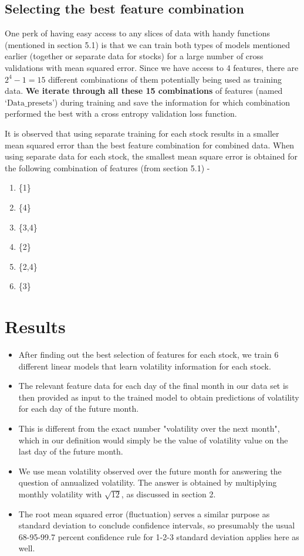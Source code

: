 \documentclass{article}
\begin{document}
\subsection{Selecting the best feature combination}
One perk of having easy access to any slices of data with handy functions (mentioned in section 5.1) is that we can train both types of models mentioned earlier (together or separate data for stocks) for a large number of cross validations with mean squared error. Since we have access to 4 features, there are $2^4-1 = 15$ different combinations of them potentially being used as training data. \textbf{We iterate through all these 15 combinations} of features (named $\text{`Data\_presets'}$) during training and save the information for which combination performed the best with a cross entropy validation loss function. 

It is observed that using separate training for each stock results in a smaller mean squared error than the best feature combination for combined data. When using separate data for each stock, the smallest mean square error is obtained for the following combination of features (from section 5.1) -
\begin{multicols}{6}
	\begin{enumerate}[a :]
		\item \{1\}		
		\item \{4\}
		\item \{3,4\}
		\item \{2\}
		\item \{2,4\}
		\item \{3\}
	\end{enumerate}
\end{multicols}

\section{Results}
\begin{itemize}
	\item After finding out the best selection of features for each stock, we train $6$ different linear models that learn volatility information for each stock. 
	\item The relevant feature data for each day of the final month in our data set is then provided as input to the trained model to obtain predictions of volatility for each day of the future month. 
	\item This is different from the exact number "volatility over the next month", which in our definition would simply be the value of volatility value on the last day of the future month. 
	\item We use mean volatility observed over the future month for answering the question of annualized volatility. The answer is obtained by multiplying monthly volatility with $\sqrt{12}$, as discussed in section 2.
	\item The root mean squared error (fluctuation) serves a similar purpose as standard deviation to conclude confidence intervals, so presumably the usual 68-95-99.7 percent confidence rule for 1-2-3 standard deviation applies here as well.
\end{itemize}
\end{document}
